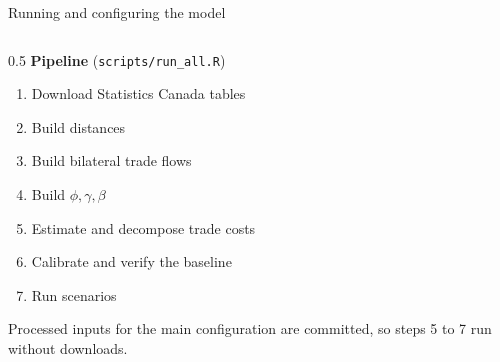 \documentclass[aspectratio=169,9pt,t]{beamer}
\begin{document}
\begin{frame}{Running and configuring the model}
  \begin{columns}[T]
    \begin{column}{0.5\textwidth}
      \small
      \textbf{Pipeline} (\texttt{scripts/run\_all.R})
      \begin{enumerate}
        \item Download Statistics Canada tables
        \item Build distances
        \item Build bilateral trade flows
        \item Build $\phi,\gamma,\beta$
        \item Estimate and decompose trade costs
        \item Calibrate and verify the baseline
        \item Run scenarios
      \end{enumerate}
      Processed inputs for the main configuration are committed, so steps
      5 to 7 run without downloads.


\end{column}
\end{columns}
\end{frame}
\end{document}
